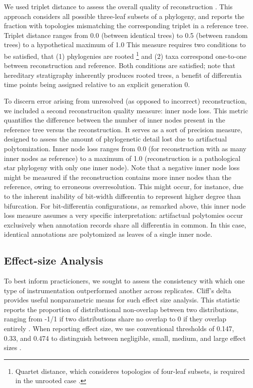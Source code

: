 We used triplet distance to assess the overall quality of reconstruction \citep{critchlow1996triples}.
This approach considers all possible three-leaf subsets of a phylogeny, and reports the fraction with topologies mismatching the corresponding triplet in a reference tree.
Triplet distance ranges from 0.0 (between identical trees) to 0.5 (between random trees) to a hypothetical maximum of 1.0
This measure requires two conditions to be satisfied, that (1) phylogenies are rooted%
\footnote{Quartet distance, which consideres topologies of four-leaf subsets, is required in the unrooted case \citep{estabrook1985comparison}.}
and (2) taxa correspond one-to-one between reconstruction and reference.
Both conditions are satisfied; note that hereditary stratigraphy inherently produces rooted trees, a benefit of differentia time points being assigned relative to an explicit generation 0.

To discern error arising from unresolved (as opposed to incorrect) reconstruction, we included a second reconstruciton quality measure: inner node loss.
This metric quantifies the difference between the number of inner nodes present in the reference tree versus the reconstruction. 
It serves as a sort of precision measure, designed to assess the amount of phylogenetic detail lost due to artifactual polytomization.
Inner node loss ranges from 0.0 (for reconstruction with as many inner nodes as reference) to a maximum of 1.0 (reconstruction is a pathological star phylogeny with only one inner node).
Note that a negative inner node loss might be measured if the reconstruction contains more inner nodes than the reference, owing to erroneous overresolution. 
This might occur, for instance, due to the inherent inability of bit-width differentia to represent higher degree than bifurcation.
For bit-differentia configurations, as remarked above, this inner node loss measure assumes a very specific interpretation: artifactual polytomies occur exclusively when annotation records share all differentia in common.
In this case, identical annotations are polytomized as leaves of a single inner node.

\subsection{Effect-size Analysis}

To best inform practicioners, we sought to assess the consistency with which one type of instrumentation outperformed another across replicates.
Cliff's delta provides useful nonparametric means for such effect size analysis.
This statistic reports the proportion of distributional non-overlap between two distributions, ranging from -1/1 if two distributions share no overlap to 0 if they overlap entirely \citep{meissel2024using,cliff1993dominance}.
When reporting effect size, we use conventional thresholds of 0.147, 0.33, and 0.474 to distinguish between negligible, small, medium, and large effect sizes \citep{hess2004robust}.

